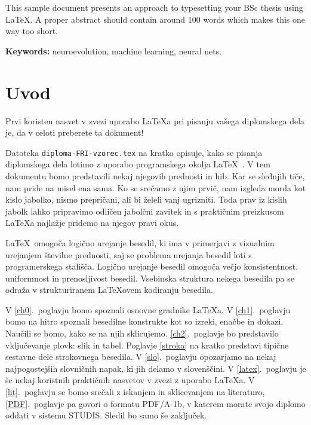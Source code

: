 \documentclass[a4paper,12pt,openright]{book}
\newcommand{\tkeywordsEn}{neuroevolution, machine learning, neural nets}
\newcommand{\clearemptydoublepage}{\newpage{\pagestyle{empty}\cleardoublepage}}
\begin{document}
    \noindent This sample document presents an approach to typesetting your BSc thesis using \LaTeX.
    A proper abstract should contain around 100 words which makes this one way too short.
    \bigskip

    \noindent\textbf{Keywords:} \tkeywordsEn.
    \clearemptydoublepage

    \mainmatter
    \setcounter{page}{1}
    \pagestyle{fancy}


    \chapter{Uvod}
    Prvi koristen nasvet v zvezi uporabo \LaTeX{a} pri pisanju vašega diplomskega dela je, da v celoti preberete ta dokument!

    Datoteka {\tt diploma-FRI-vzorec.tex} na kratko opisuje, kako se pisanja diplomskega dela lotimo z uporabo programskega okolja \LaTeX~\cite{lamport,nenajkrajsi}.
    V tem dokumentu bomo predstavili nekaj njegovih prednosti in hib.
    Kar se slednjih tiče, nam pride na misel ena sama.
    Ko se srečamo z njim prvič, nam izgleda morda kot kislo jabolko, nismo prepričani, ali bi želeli vanj ugrizniti.
    Toda prav iz kislih jabolk lahko pripravimo odličen jabolčni zavitek in s praktičnim preizkusom \LaTeX a najlažje pridemo na njegov pravi okus.

    \LaTeX\ omogoča logično urejanje besedil, ki ima v primerjavi z vizualnim urejanjem številne prednosti, saj se problema urejanja besedil loti s programerskega stališča.
    Logično urejanje besedil omogoča večjo konsistentnost, uniformnost in prenosljivost besedil.
    Vsebinska struktura nekega besedila pa se odraža v strukturiranem \LaTeX ovem kodiranju besedila.

    V \ref{ch0}.~poglavju bomo spoznali osnovne gradnike \LaTeX{a}.
    V \ref{ch1}.~poglavju bomo na hitro spoznali besedilne konstrukte kot so izreki, enačbe in dokazi.
    Naučili se bomo, kako se na njih sklicujemo.
    \ref{ch2}.~poglavje bo predstavilo vključevanje plovk: slik in tabel.
    Poglavje \ref{stroka} na kratko predstavi tipične sestavne dele strokovnega besedila.
    V \ref{slo}.~poglavju opozarjamo na nekaj najpogostejših slovničnih napak, ki jih delamo v slovenščini.
    V \ref{latex}.~poglavju je še nekaj koristnih praktičnih nasvetov v zvezi z uporabo \LaTeX{a}.
    V \ref{lit}.~poglavju se bomo srečali z iskanjem in sklicevanjem na literaturo,
    \ref{PDF}.~poglavje pa govori o formatu PDF/A-1b, v katerem morate svojo diplomo oddati v sistemu STUDIS.
    Sledil bo samo še zaključek.
\end{document}
